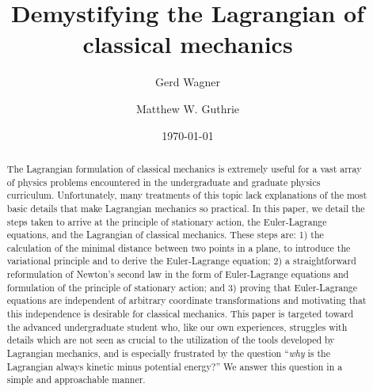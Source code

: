 \documentclass[prb,preprint]{revtex4-1}
\begin{document}

\title{Demystifying the Lagrangian of classical mechanics} %

\author{Gerd Wagner}

\author{Matthew W. Guthrie}


\date{\today}

\begin{abstract} 
The Lagrangian formulation of classical mechanics is extremely useful for a vast array of physics problems encountered in the undergraduate and graduate physics curriculum. Unfortunately, many treatments of this topic lack explanations of the most basic details that make Lagrangian mechanics so practical. In this paper, we detail the steps taken to arrive at the principle of stationary action, the Euler-Lagrange equations, and the Lagrangian of classical mechanics. These steps are: 1) the calculation of the minimal distance between two points in a plane, to introduce the variational principle and to derive the Euler-Lagrange equation; 2) a straightforward reformulation of Newton's second law in the form of Euler-Lagrange equations and formulation of the principle of stationary action; and 3) proving that Euler-Lagrange equations are independent of arbitrary coordinate transformations and motivating that this independence is desirable for classical mechanics. This paper is targeted toward the advanced undergraduate student who, like our own experiences, struggles with details which are not seen as crucial to the utilization of the tools developed by Lagrangian mechanics, and is especially frustrated by the question ``\textit{why} is the Lagrangian always kinetic minus potential energy?'' We answer this question in a simple and approachable manner.
\end{abstract}  
\end{document}
